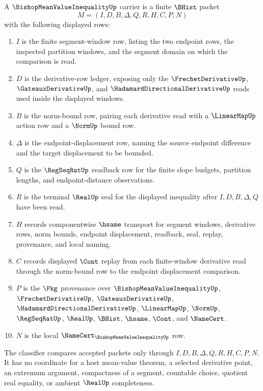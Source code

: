 \begin{definition}
\label{def:bishop-mean-value-inequality-carrier}
A $\BishopMeanValueInequalityUp$ carrier is a finite $\BHist$ packet
$$
M=(I,D,B,\Delta,Q,R,H,C,P,N)
$$
with the following displayed rows:
\begin{enumerate}
\item $I$ is the finite segment-window row, listing the two endpoint rows, the inspected partition windows, and the segment domain on which the comparison is read.
\item $D$ is the derivative-row ledger, exposing only the $\FrechetDerivativeUp$, $\GateauxDerivativeUp$, and $\HadamardDirectionalDerivativeUp$ reads used inside the displayed windows.
\item $B$ is the norm-bound row, pairing each derivative read with a $\LinearMapUp$ action row and a $\NormUp$ bound row.
\item $\Delta$ is the endpoint-displacement row, naming the source endpoint difference and the target displacement to be bounded.
\item $Q$ is the $\RegSeqRatUp$ readback row for the finite slope budgets, partition lengths, and endpoint-distance observations.
\item $R$ is the terminal $\RealUp$ seal for the displayed inequality after $I,D,B,\Delta,Q$ have been read.
\item $H$ records componentwise $\hsame$ transport for segment windows, derivative rows, norm bounds, endpoint displacement, readback, seal, replay, provenance, and local naming.
\item $C$ records displayed $\Cont$ replay from each finite-window derivative read through the norm-bound row to the endpoint displacement comparison.
\item $P$ is the $\Pkg$ provenance over $\BishopMeanValueInequalityUp$, $\FrechetDerivativeUp$, $\GateauxDerivativeUp$, $\HadamardDirectionalDerivativeUp$, $\LinearMapUp$, $\NormUp$, $\RegSeqRatUp$, $\RealUp$, $\BHist$, $\hsame$, $\Cont$, and $\NameCert$.
\item $N$ is the local $\NameCert_{\BishopMeanValueInequalityUp}$ row.
\end{enumerate}
The classifier compares accepted packets only through $I,D,B,\Delta,Q,R,H,C,P,N$. It has no coordinate for a host mean-value theorem, a selected derivative point, an extremum argument, compactness of a segment, countable choice, quotient real equality, or ambient $\RealUp$ completeness.
\end{definition}

